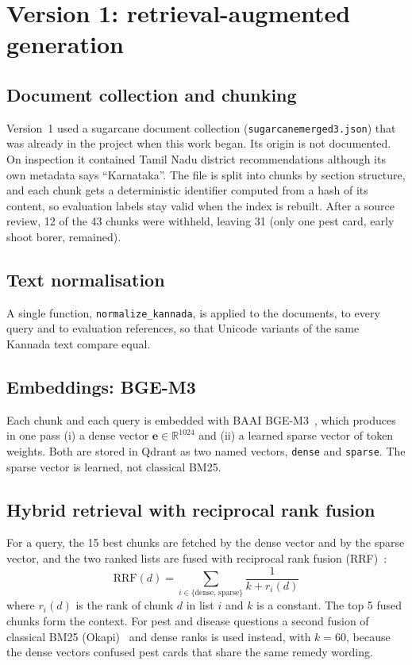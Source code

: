 \section{Version 1: retrieval-augmented generation}

\subsection{Document collection and chunking}
Version~1 used a sugarcane document collection (\texttt{sugarcanemerged3.json}) that was
already in the project when this work began. Its origin is not documented. On inspection
it contained Tamil Nadu district recommendations although its own metadata says
``Karnataka''. The file is split into chunks by section structure, and each chunk gets a
deterministic identifier computed from a hash of its content, so evaluation labels stay
valid when the index is rebuilt. After a source review, 12 of the 43 chunks were withheld,
leaving 31 (only one pest card, early shoot borer, remained).

\subsection{Text normalisation}
A single function, \texttt{normalize\_kannada}, is applied to the documents, to every
query and to evaluation references, so that Unicode variants of the same Kannada text
compare equal.

\subsection{Embeddings: BGE-M3}
Each chunk and each query is embedded with BAAI BGE-M3~\cite{chen2024bgem3}, which
produces in one pass (i) a dense vector $\mathbf{e}\in\mathbb{R}^{1024}$ and (ii) a learned
sparse vector of token weights. Both are stored in Qdrant as two named vectors,
\texttt{dense} and \texttt{sparse}. The sparse vector is learned, not classical BM25.

\subsection{Hybrid retrieval with reciprocal rank fusion}
For a query, the 15 best chunks are fetched by the dense vector and by the sparse vector,
and the two ranked lists are fused with reciprocal rank fusion (RRF)~\cite{cormack2009rrf}:
\begin{equation}
  \mathrm{RRF}(d) = \sum_{i\in\{\text{dense},\,\text{sparse}\}} \frac{1}{k + r_i(d)}
\end{equation}
where $r_i(d)$ is the rank of chunk $d$ in list $i$ and $k$ is a constant. The top 5 fused
chunks form the context. For pest and disease questions a second fusion of classical
BM25 (Okapi)~\cite{robertson2009bm25} and dense ranks is used instead, with $k=60$, because the dense
vectors confused pest cards that share the same remedy wording.

